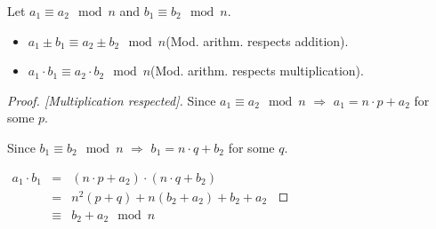 \begin{frame}
\vskip -0.17cm
\begin{lemma}
Let $a_1 \equiv a_2 \mod n$ and $b_1\equiv b_2 \mod n$. 
\begin{itemize}
\item $a_1\pm b_1 \equiv a_2 \pm b_2 \mod n$\hfill (Mod. arithm. respects addition).
\item $a_1\cdot b_1 \equiv a_2 \cdot b_2 \mod n$\hfill  (Mod. arithm. respects multiplication).
\end{itemize}
\end{lemma}
\vskip -0.17cm
\begin{proof}[Proof. {[Multiplication respected]}]
Since $a_1 \equiv a_2  \mod n$ $\Rightarrow$ $a_1 = n\cdot p + a_2 $ for some $p$.

Since $b_1 \equiv b_2  \mod n$ $\Rightarrow$ $b_1 = n\cdot q + b_2 $ for some $q$.	

\hfil\hfil  $\begin{array}{rclll}
a_1 \cdot b_1 &=& ( n\cdot p + a_2)\cdot (n\cdot q + b_2 ) \\
&=& n^2 (p+q) + n(b_2+a_2) + b_2 + a_2 \\
&\equiv& b_2 + a_2\mod n
\end{array}
$
\end{proof}

\vskip -0.17cm
\end{frame}